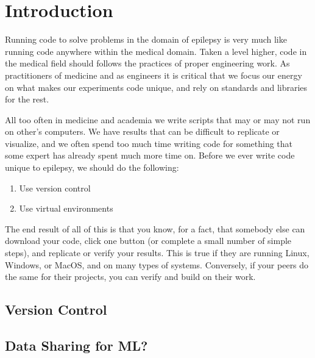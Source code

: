 \section{Introduction}
Running code to solve problems in the domain of epilepsy is very much like running code anywhere within the medical domain. Taken a level higher, code in the medical field should follows the practices of proper engineering work.
As practitioners of medicine and as engineers it is critical that we focus our energy on what makes our experiments code unique, and rely on standards and libraries for the rest.

All too often in medicine and academia we write scripts that may or may not run on other's computers.
We have results that can be difficult to replicate or visualize, and we often spend too much time writing code for something that some expert has already spent much more time on.
Before we ever write code unique to epilepsy, we should do the following:
\begin{enumerate}
    \item Use version control
    \item Use virtual environments
\end{enumerate}

The end result of all of this is that you know, for a fact, that somebody else can download your code, click one button (or complete a small number of simple steps), and replicate or verify your results.
This is true if they are running Linux, Windows, or MacOS, and on many types of systems.
Conversely, if your peers do the same for their projects, you can verify and build on their work.

\subsection{Version Control}

\subsection{Data Sharing for ML?}
